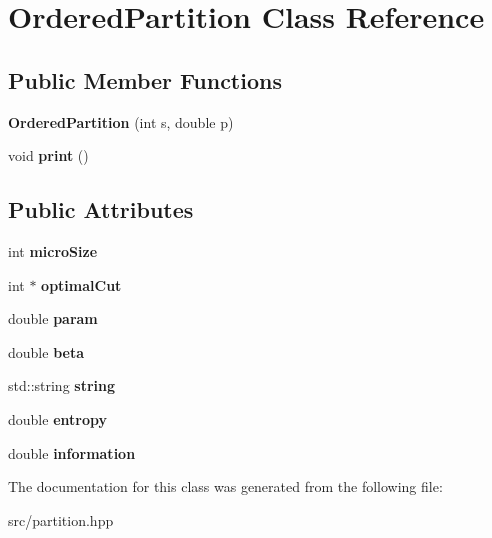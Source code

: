 \hypertarget{classOrderedPartition}{\section{Ordered\-Partition Class Reference}
\label{classOrderedPartition}
}
\subsection*{Public Member Functions}
\begin{DoxyCompactItemize}
\item 
\hypertarget{classOrderedPartition_aabf4e3ee7ddd8279efd1d30f13844dbf}{{\bfseries Ordered\-Partition} (int s, double p)}\label{classOrderedPartition_aabf4e3ee7ddd8279efd1d30f13844dbf}

\item 
\hypertarget{classOrderedPartition_ad62349b410a52274043a328dafb13342}{void {\bfseries print} ()}\label{classOrderedPartition_ad62349b410a52274043a328dafb13342}

\end{DoxyCompactItemize}
\subsection*{Public Attributes}
\begin{DoxyCompactItemize}
\item 
\hypertarget{classOrderedPartition_ac4e60b2ef3d286b496d3274f153ff610}{int {\bfseries micro\-Size}}\label{classOrderedPartition_ac4e60b2ef3d286b496d3274f153ff610}

\item 
\hypertarget{classOrderedPartition_aa87bf05471b9071a94cf53226552f436}{int $\ast$ {\bfseries optimal\-Cut}}\label{classOrderedPartition_aa87bf05471b9071a94cf53226552f436}

\item 
\hypertarget{classOrderedPartition_a8c7fef058b25165c69652e8c78d9bd7e}{double {\bfseries param}}\label{classOrderedPartition_a8c7fef058b25165c69652e8c78d9bd7e}

\item 
\hypertarget{classOrderedPartition_a68c0b17fa5a9fc525af12b9960874ae7}{double {\bfseries beta}}\label{classOrderedPartition_a68c0b17fa5a9fc525af12b9960874ae7}

\item 
\hypertarget{classOrderedPartition_a6508f965f7e829e361c5d73acccce6eb}{std\-::string {\bfseries string}}\label{classOrderedPartition_a6508f965f7e829e361c5d73acccce6eb}

\item 
\hypertarget{classOrderedPartition_acc541302636a852fbb51c876277595a9}{double {\bfseries entropy}}\label{classOrderedPartition_acc541302636a852fbb51c876277595a9}

\item 
\hypertarget{classOrderedPartition_a414f6978e006ba9d647e48ceef9143b8}{double {\bfseries information}}\label{classOrderedPartition_a414f6978e006ba9d647e48ceef9143b8}

\end{DoxyCompactItemize}


The documentation for this class was generated from the following file\-:\begin{DoxyCompactItemize}
\item 
src/partition.\-hpp\end{DoxyCompactItemize}
